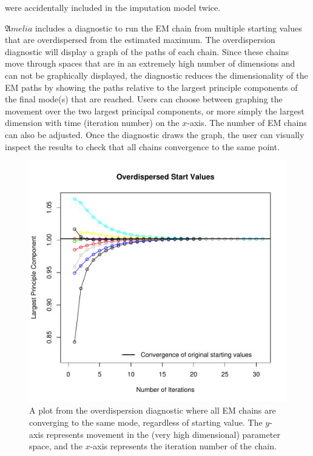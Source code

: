 \documentclass[12pt,titlepage]{article}
\newcommand{\Amelia}{\ensuremath{\mathfrak Amelia} }
\begin{document}
were accidentally included in the imputation model twice.

\Amelia includes a diagnostic to run the EM chain from multiple
starting values that are overdispersed from the estimated maximum.
The overdispersion diagnostic will display a graph of the paths of
each chain.  Since these chains move through spaces that are in an
extremely high number of dimensions and can not be graphically
displayed, the diagnostic reduces the dimensionality of the EM paths
by showing the paths relative to the largest principle components of
the final mode(s) that are reached.  Users can choose between graphing
the movement over the two largest principal components, or more simply
the largest dimension with time (iteration number) on the $x$-axis.
The number of EM chains can also be adjusted.  Once the diagnostic
draws the graph, the user can visually inspect the results to check
that all chains convergence to the same point.
\begin{figure}[ht]\label{f:overgood}
  \centering \includegraphics[scale=.7]{overdis1d}
  \caption{A plot from the overdispersion diagnostic where all EM
    chains are converging to the same mode, regardless of starting
    value.  The $y$-axis represents movement in the (very high
    dimensional) parameter space, and the $x$-axis represents the
    iteration number of the chain.}
\end{figure}
\end{document}
